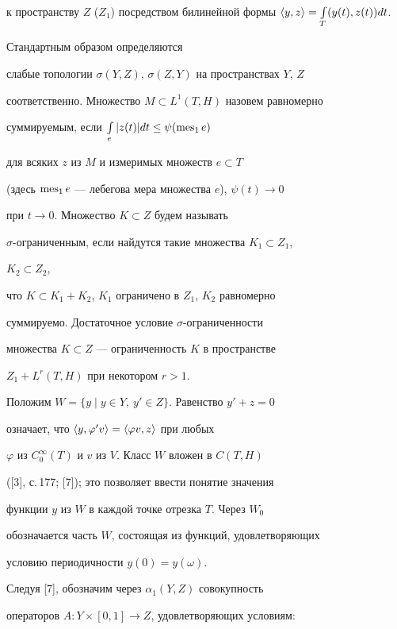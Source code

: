 к пространству $Z$ ($Z_1$) посредством билинейной формы $\la 


y,z\ra=\int\limits_T(y(t),z(t))d t$. 


Стандартным образом определяются 


слабые топологии $\sigma(Y,Z)$, $\sigma(Z,Y)$ на пространствах $Y$, $Z$ 


соответственно. Множество $M\subset L^1(T,H)$ назовем равномерно 


суммируемым, если $\int\limits_e|z(t)|d t\le\psi(\operatorname{mes}_1e)$ 


для всяких $z$ из $M$ и измеримых множеств $e\subset T$ 


(здесь $\operatorname{mes}_1e$ --- лебегова мера множества $e$), $\psi(t)\to0$ 


при $t\to0$. Множество $K\subset Z$ будем называть 


$\sigma$-ограниченным, если найдутся такие множества $K_1\subset Z_1$, 


$K_2\subset Z_2$, 


что $K\subset K_1+K_2$, $K_1$ ограничено в $Z_1$, $K_2$ равномерно 


суммируемо. Достаточное условие $\sigma$-ограниченности 


множества $K\subset Z$ --- ограниченность $K$ в пространстве 


$Z_1+L^r(T,H)$ при некотором $r>1$. 


 


Положим $W=\{y\mid y\in Y,\ y'\in Z\}$. Равенство $y'+z=0$ 


означает, что $\langle y,\varphi' v\rangle=\langle\varphi v,z\rangle$ при любых 


$\varphi$ из $C^\infty_0(T)$ и $v$ из $V$. Класс $W$ вложен в $C(T,H)$ 


([3], с.\,177; [7]); это позволяет ввести понятие значения 


функции $y$ из $W$ в каждой точке отрезка $T$. Через $W_0$ 


обозначается часть $W$, состоящая из функций, удовлетворяющих 


условию периодичности $y(0)=y(\omega)$. 


 


Следуя [7], обозначим через $\alpha_1(Y,Z)$ совокупность 


операторов $A:Y\times[0,1]\to Z$, удовлетворяющих условиям: 


 


